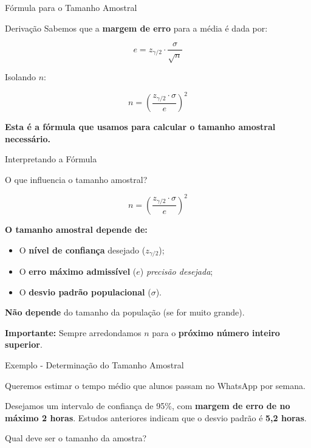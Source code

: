 \documentclass[14pt,aspectratio=1610]{beamer}
\begin{document}
	\begin{frame}{Fórmula para o Tamanho Amostral}
		\begin{block}{Derivação}
			Sabemos que a \textbf{margem de erro} para a média é dada por:
			
			\[
			e = z_{\gamma/2} \cdot \frac{\sigma}{\sqrt{n}}
			\]
			
			Isolando $n$:
			
			\[
			n = \left( \frac{z_{\gamma/2} \cdot \sigma}{e} \right)^2
			\]
			
			\textbf{Esta é a fórmula que usamos para calcular o tamanho amostral necessário.}
		\end{block}
	\end{frame}
	
	\begin{frame}{Interpretando a Fórmula}
		\begin{block}{O que influencia o tamanho amostral?}
			
			\[
			n = \left( \frac{z_{\gamma/2} \cdot \sigma}{e} \right)^2
			\]
			
			\textbf{O tamanho amostral depende de:}
			\begin{itemize}
				\item O \textbf{nível de confiança} desejado ($z_{\gamma/2}$);
				\item O \textbf{erro máximo admissível} ($e$) \textendash{} \textit{precisão desejada};
				\item O \textbf{desvio padrão populacional} ($\sigma$).
			\end{itemize}
			
			\textbf{Não depende} do tamanho da população (se for muito grande).
			
			\textbf{Importante:} Sempre arredondamos $n$ para o \textbf{próximo número inteiro superior}.
		\end{block}
	\end{frame}
	
	\begin{frame}{Exemplo - Determinação do Tamanho Amostral}
		\begin{block}{}
			\justifying
			Queremos estimar o tempo médio que alunos passam no WhatsApp por semana.
			
			Desejamos um intervalo de confiança de 95\%, com \textbf{margem de erro de no máximo 2 horas}. Estudos anteriores indicam que o desvio padrão é \textbf{5,2 horas}.
			
			Qual deve ser o tamanho da amostra?
		\end{block}
	
	\end{frame}
	
\end{document}
